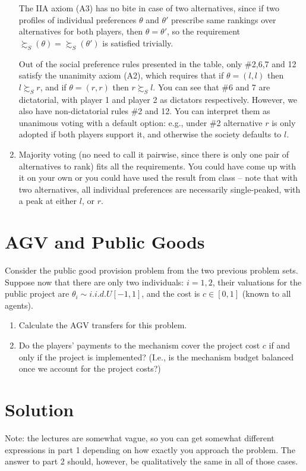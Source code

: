 \documentclass[a4paper]{article}
\begin{document}
\begin{enumerate}
		The IIA axiom (A3) has no bite in case of two alternatives, since if two profiles of individual preferences $\theta$ and $\theta'$ prescribe same rankings over alternatives for both players, then $\theta=\theta'$, so the requirement $\succsim_S(\theta)=\succsim_S(\theta')$ is satisfied trivially.
		 
		Out of the social preference rules presented in the table, only \#2,6,7 and 12 satisfy the unanimity axiom (A2), which requires that if $\theta=(l,l)$ then $l \succsim_S r$, and if $\theta=(r,r)$ then $r \succsim_S l$. You can see that \#6 and 7 are dictatorial, with player 1 and player 2 as dictators respectively. However, we also have non-dictatorial rules \#2 and 12. You can interpret them as unanimous voting with a default option: e.g., under \#2 alternative $r$ is only adopted if both players support it, and otherwise the society defaults to $l$.
		
		\item Majority voting (no need to call it pairwise, since there is only one pair of alternatives to rank) fits all the requirements. You could have come up with it on your own or you could have used the result from class -- note that with two alternatives, all individual preferences are necessarily single-peaked, with a peak at either $l$, or $r$.
		
	\end{enumerate}
\fi



\section{AGV and Public Goods}

Consider the public good provision problem from the two previous problem sets. Suppose now that there are only two individuals: $i=1,2$, their valuations for the public project are $\theta_i \sim i.i.d. U[-1,1]$, and the cost is $c \in [0,1]$ (known to all agents).

\begin{enumerate}
	\item Calculate the AGV transfers for this problem.
	\item Do the players' payments to the mechanism cover the project cost $c$ if and only if the project is implemented? (I.e., is the mechanism budget balanced once we account for the project costs?)
\end{enumerate}


\section*{Solution}
Note: the lectures are somewhat vague, so you can get somewhat different expressions in part 1 depending on how exactly you approach the problem. The answer to part 2 should, however, be qualitatively the same in all of those cases.
\end{document}
